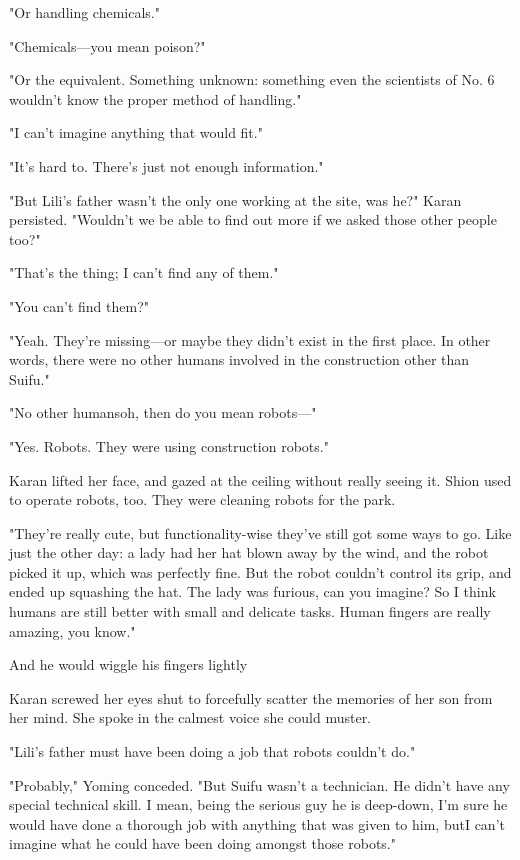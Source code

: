"Or handling chemicals."

"Chemicals---you mean poison?"

"Or the equivalent. Something unknown: something even the scientists of
No. 6 wouldn't know the proper method of handling."

"I can't imagine anything that would fit."

"It's hard to. There's just not enough information."

"But Lili's father wasn't the only one working at the site, was he?"
Karan persisted. "Wouldn't we be able to find out more if we asked those
other people too?"

"That's the thing; I can't find any of them."

"You can't find them?"

"Yeah. They're missing---or maybe they didn't exist in the first place. In
other words, there were no other humans involved in the construction
other than Suifu."

"No other humans\el oh, then do you mean robots---"

"Yes. Robots. They were using construction robots."

Karan lifted her face, and gazed at the ceiling without really seeing
it. Shion used to operate robots, too. They were cleaning robots for the
park.

"They're really cute, but functionality-wise they've still got some ways
to go. Like just the other day: a lady had her hat blown away by the
wind, and the robot picked it up, which was perfectly fine. But the
robot couldn't control its grip, and ended up squashing the hat. The
lady was furious, can you imagine? So I think humans are still better
with small and delicate tasks. Human fingers are really amazing, you
know."

And he would wiggle his fingers lightly\el 

Karan screwed her eyes shut to forcefully scatter the memories of her
son from her mind. She spoke in the calmest voice she could muster.

"Lili's father must have been doing a job that robots couldn't do."

"Probably," Yoming conceded. "But Suifu wasn't a technician. He didn't
have any special technical skill. I mean, being the serious guy he is
deep-down, I'm sure he would have done a thorough job with anything that
was given to him, but\el I can't imagine what he could have been doing
amongst those robots."

